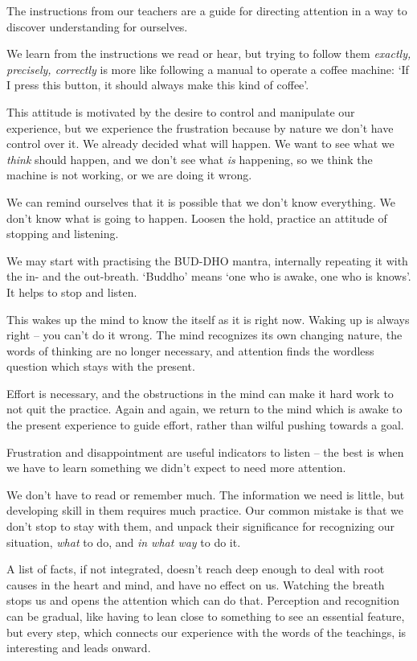 The instructions from our teachers are a guide for directing attention
in a way to discover understanding for ourselves.

We learn from the instructions we read or hear, but trying to follow
them \emph{exactly, precisely, correctly} is more like following a
manual to operate a coffee machine: `If I press this button, it should
always make this kind of coffee'.

This attitude is motivated by the desire to control and manipulate our
experience, but we experience the frustration because by nature we don't
have control over it. We already decided what will happen. We want to
see what we \emph{think} should happen, and we don't see what \emph{is}
happening, so we think the machine is not working, or we are doing it
wrong.

We can remind ourselves that it is possible that we don't know
everything. We don't know what is going to happen. Loosen the hold,
practice an attitude of stopping and listening.


We may start with practising the BUD-DHO mantra, internally repeating it
with the in- and the out-breath. `Buddho' means `one who is awake, one
who is knows'. It helps to stop and listen.

This wakes up the mind to know the itself as it is right now. Waking up
is always right -- you can't do it wrong. The mind recognizes its own
changing nature, the words of thinking are no longer necessary, and
attention finds the wordless question which stays with the present.

Effort is necessary, and the obstructions in the mind can make it hard
work to not quit the practice. Again and again, we return to the mind
which is awake to the present experience to guide effort, rather than
wilful pushing towards a goal.

Frustration and disappointment are useful indicators to listen -- the
best is when we have to learn something we didn't expect to need more
attention.

We don't have to read or remember much. The information we need is
little, but developing skill in them requires much practice. Our common
mistake is that we don't stop to stay with them, and unpack their
significance for recognizing our situation, \emph{what} to do, and
\emph{in what way} to do it.

A list of facts, if not integrated, doesn't reach deep enough to deal
with root causes in the heart and mind, and have no effect on us.
Watching the breath stops us and opens the attention which can do that.
Perception and recognition can be gradual, like having to lean close to
something to see an essential feature, but every step, which connects
our experience with the words of the teachings, is interesting and leads
onward.

